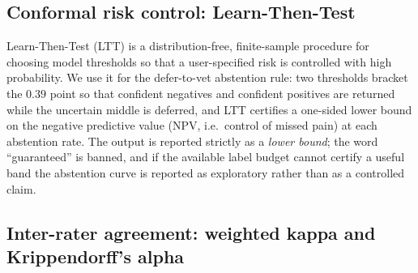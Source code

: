 \subsection{Conformal risk control: Learn-Then-Test}
\label{subsec:bg-ltt}

Learn-Then-Test (LTT) \cite{angelopoulos2021ltt} is a distribution-free,
finite-sample procedure for choosing model thresholds so that a user-specified
risk is controlled with high probability. We use it for the defer-to-vet
abstention rule: two thresholds bracket the $0.39$ point so that confident
negatives and confident positives are returned while the uncertain middle is
deferred, and LTT certifies a one-sided lower bound on the negative predictive
value (NPV, i.e.\ control of missed pain) at each abstention rate. The output is
reported strictly as a \emph{lower bound}; the word \enquote{guaranteed} is
banned, and if the available label budget cannot certify a useful band the
abstention curve is reported as exploratory rather than as a controlled claim.

\subsection{Inter-rater agreement: weighted kappa and Krippendorff's alpha}
\label{subsec:bg-agreement}

